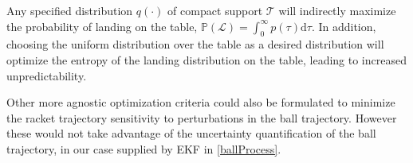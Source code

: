 \documentclass[letterpaper, 10 pt, conference]{ieeeconf}
\newcommand{\court}{\mathcal{T}} %
\newcommand{\prob}{\mathbb{P}} %
\newcommand{\landTime}{\tau} %
\newcommand{\landEvent}{\mathcal{L}} %
\newcommand{\landDist}{p(\tau)} %
\begin{document}
Any specified distribution $q(\cdot)$ of compact support $\court$ will indirectly maximize the probability of landing on the table, $\prob(\landEvent) = \int_{0}^{\infty}\landDist\textrm{d}\landTime$. In addition, choosing the uniform distribution over the table as a desired distribution will optimize the entropy of the landing distribution on the table, leading to increased unpredictability. 

Other more agnostic optimization criteria could also be formulated to minimize the racket trajectory sensitivity to perturbations in the ball trajectory. However these would not take advantage of the uncertainty quantification of the ball trajectory, in our case supplied by EKF in \eqref{ballProcess}.
\end{document}
